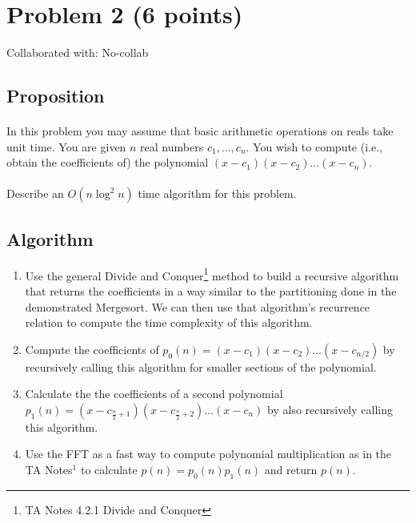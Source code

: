 \documentclass{article}
\begin{document}
\newpage
\section{Problem 2 (6 points)}
Collaborated with: No-collab

\subsection{Proposition}

\paragraph{\indent}
In this problem you may assume that basic arithmetic operations on reals take unit time.
You are given \(n\) real numbers \(c_1, \dots, c_n\). You wish to compute (i.e., obtain the
coefficients of) the polynomial \((x - c_1)(x - c_2)\dots(x - c_n)\).

\paragraph{\indent}
Describe an \(O(n \log^2 n)\) time algorithm for this problem.

\subsection{Algorithm}

\begin{enumerate}
      \item Use the general Divide and Conquer\footnote{TA Notes 4.2.1 Divide and Conquer}
            method to build a recursive algorithm that returns the coefficients in a
            way similar to the partitioning done in the demonstrated Mergesort. We can
            then use that
            algorithm's recurrence relation to compute the time complexity of this algorithm.
      \item Compute the coefficients of \(p_0(n) = (x-c_1)(x-c_2)\dots(x-c_{n/2})\) by
            recursively calling this algorithm for smaller sections of the polynomial.
      \item Calculate the the coefficients of a second polynomial \(p_1(n)=(x-c_{\frac{n}{2}
            + 1})(x-c_{\frac{n}{2} + 2})\dots(x-c_{n})\) by also recursively calling this
            algorithm.
      \item Use the FFT as a fast way to compute polynomial multiplication as in the TA Notes\(^1\) to
            calculate \( p{(n)} = p_0{(n)} p_1{(n)} \) and return \(p(n)\).

\end{enumerate}
\end{document}
